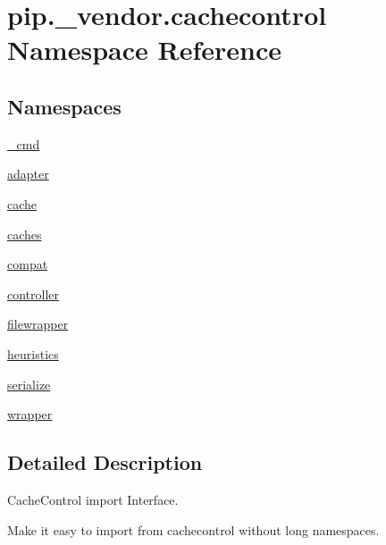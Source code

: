 \hypertarget{namespacepip_1_1__vendor_1_1cachecontrol}{}\section{pip.\+\_\+vendor.\+cachecontrol Namespace Reference}
\label{namespacepip_1_1__vendor_1_1cachecontrol}
\subsection*{Namespaces}
\begin{DoxyCompactItemize}
\item 
 \hyperlink{namespacepip_1_1__vendor_1_1cachecontrol_1_1__cmd}{\+\_\+cmd}
\item 
 \hyperlink{namespacepip_1_1__vendor_1_1cachecontrol_1_1adapter}{adapter}
\item 
 \hyperlink{namespacepip_1_1__vendor_1_1cachecontrol_1_1cache}{cache}
\item 
 \hyperlink{namespacepip_1_1__vendor_1_1cachecontrol_1_1caches}{caches}
\item 
 \hyperlink{namespacepip_1_1__vendor_1_1cachecontrol_1_1compat}{compat}
\item 
 \hyperlink{namespacepip_1_1__vendor_1_1cachecontrol_1_1controller}{controller}
\item 
 \hyperlink{namespacepip_1_1__vendor_1_1cachecontrol_1_1filewrapper}{filewrapper}
\item 
 \hyperlink{namespacepip_1_1__vendor_1_1cachecontrol_1_1heuristics}{heuristics}
\item 
 \hyperlink{namespacepip_1_1__vendor_1_1cachecontrol_1_1serialize}{serialize}
\item 
 \hyperlink{namespacepip_1_1__vendor_1_1cachecontrol_1_1wrapper}{wrapper}
\end{DoxyCompactItemize}


\subsection{Detailed Description}
\begin{DoxyVerb}CacheControl import Interface.

Make it easy to import from cachecontrol without long namespaces.
\end{DoxyVerb}
 